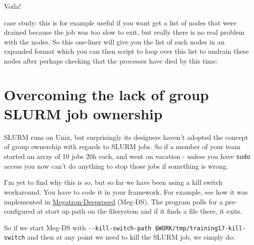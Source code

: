 \documentclass[
]{report}
\newenvironment{Shaded}{\begin{snugshade}}{\end{snugshade}}
\newcommand{\AttributeTok}[1]{\textcolor[rgb]{0.40,0.45,0.13}{#1}}
\newcommand{\ExtensionTok}[1]{\textcolor[rgb]{0.00,0.23,0.31}{#1}}
\newcommand{\FunctionTok}[1]{\textcolor[rgb]{0.28,0.35,0.67}{#1}}
\newcommand{\KeywordTok}[1]{\textcolor[rgb]{0.00,0.23,0.31}{#1}}
\newcommand{\NormalTok}[1]{\textcolor[rgb]{0.00,0.23,0.31}{#1}}
\newcommand{\StringTok}[1]{\textcolor[rgb]{0.13,0.47,0.30}{#1}}
\newcommand{\VariableTok}[1]{\textcolor[rgb]{0.07,0.07,0.07}{#1}}
\begin{document}
Voila!

case study: this is for example useful if you want get a list of nodes
that were drained because the job was too slow to exit, but really there
is no real problem with the nodes. So this one-liner will give you the
list of such nodes in an expanded format which you can then script to
loop over this list to undrain these nodes after perhaps checking that
the processes have died by this time:

\begin{Shaded}
\begin{Highlighting}[]
\ExtensionTok{sinfo} \AttributeTok{{-}R} \KeywordTok{|} \FunctionTok{grep} \StringTok{"Kill task failed"} \KeywordTok{|} \FunctionTok{perl} \AttributeTok{{-}lne} \StringTok{\textquotesingle{}/(node{-}.*[\textbackslash{}d\textbackslash{}]]+)/ \&\& print $1\textquotesingle{}} \KeywordTok{|} \FunctionTok{xargs} \AttributeTok{{-}n1}\NormalTok{ scontrol show hostnames}
\end{Highlighting}
\end{Shaded}

\section{Overcoming the lack of group SLURM job
ownership}\label{overcoming-the-lack-of-group-slurm-job-ownership}

SLURM runs on Unix, but surprisingly its designers haven't adopted the
concept of group ownership with regards to SLURM jobs. So if a member of
your team started an array of 10 jobs 20h each, and went on vacation -
unless you have \texttt{sudo} access you now can't do anything to stop
those jobs if something is wrong.

I'm yet to find why this is so, but so far we have been using a kill
switch workaround. You have to code it in your framework. For example,
see how it was implemented in
\href{https://github.com/bigscience-workshop/Megatron-DeepSpeed/blob/e52bdabbde3c6895aceb76c1bced295c2646121f/megatron/training.py\#L104}{Megatron-Deepspeed}
(Meg-DS). The program polls for a pre-configured at start up path on the
filesystem and if it finds a file there, it exits.

So if we start Meg-DS with
\texttt{-\/-kill-switch-path\ \$WORK/tmp/training17-kill-switch} and
then at any point we need to kill the SLURM job, we simply do:

\begin{Shaded}
\end{Shaded}
\end{document}
